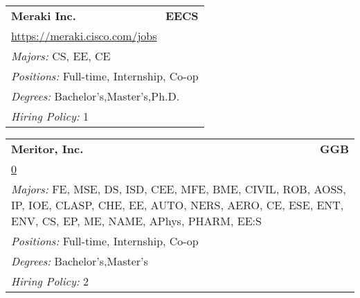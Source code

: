\documentclass[twoside]{article}
\begin{document}
\begin{center}
\begin{multicols}{3}
\begin{FlushLeft}
\begin{minipage}{\columnwidth}
\end{minipage}
 
\begin{minipage}{\columnwidth}\begin{tabularx}{.95\columnwidth}{Xr}
                 {\Large\bf Meraki Inc.} & {\Large\bf EECS}\\
    \multicolumn{2}{p{.95\columnwidth}}{\url{https://meraki.cisco.com/jobs}}\\
    \multicolumn{2}{p{.95\columnwidth}}{\emph{Majors:} CS, EE, CE}\\
    \multicolumn{2}{p{.95\columnwidth}}{\emph{Positions:} Full-time, Internship, Co-op}\\
    \multicolumn{2}{p{.95\columnwidth}}{\emph{Degrees:} Bachelor's,Master's,Ph.D.}\\
    \multicolumn{2}{p{.95\columnwidth}}{\emph{Hiring Policy:} 1}\\
    \end{tabularx}
    
\end{minipage}
 
\begin{minipage}{\columnwidth}\begin{tabularx}{.95\columnwidth}{Xr}
                 {\Large\bf Meritor, Inc.} & {\Large\bf GGB}\\
    \multicolumn{2}{p{.95\columnwidth}}{\url{0}}\\
    \multicolumn{2}{p{.95\columnwidth}}{\emph{Majors:} FE, MSE, DS, ISD, CEE, MFE, BME, CIVIL, ROB, AOSS, IP, IOE, CLASP, CHE, EE, AUTO, NERS, AERO, CE, ESE, ENT, ENV, CS, EP, ME, NAME, APhys, PHARM, EE:S}\\
    \multicolumn{2}{p{.95\columnwidth}}{\emph{Positions:} Full-time, Internship, Co-op}\\
    \multicolumn{2}{p{.95\columnwidth}}{\emph{Degrees:} Bachelor's,Master's}\\
    \multicolumn{2}{p{.95\columnwidth}}{\emph{Hiring Policy:} 2}\\
    \end{tabularx}
    
\end{minipage}
 

\end{FlushLeft}
\end{multicols}
\end{center}
\end{document}
